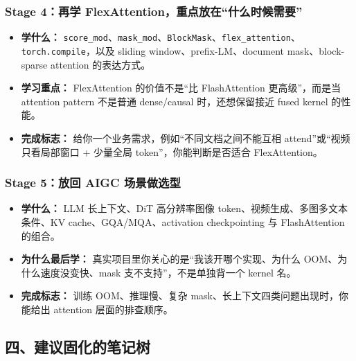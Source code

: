 \subsubsection*{Stage 4：再学 FlexAttention，重点放在“什么时候需要”}

\begin{itemize}[leftmargin=1.5em]
  \item \textbf{学什么：} \texttt{score\_mod}、\texttt{mask\_mod}、\texttt{BlockMask}、\texttt{flex\_attention}、\texttt{torch.compile}，以及 sliding window、prefix-LM、document mask、block-sparse attention 的表达方式。
  \item \textbf{学习重点：} FlexAttention 的价值不是“比 FlashAttention 更高级”，而是当 attention pattern 不是普通 dense/causal 时，还想保留接近 fused kernel 的性能。
  \item \textbf{完成标志：} 给你一个业务需求，例如“不同文档之间不能互相 attend”或“视频只看局部窗口 + 少量全局 token”，你能判断是否适合 FlexAttention。
\end{itemize}

\subsubsection*{Stage 5：放回 AIGC 场景做选型}

\begin{itemize}[leftmargin=1.5em]
  \item \textbf{学什么：} LLM 长上下文、DiT 高分辨率图像 token、视频生成、多图多文本条件、KV cache、GQA/MQA、activation checkpointing 与 FlashAttention 的组合。
  \item \textbf{为什么最后学：} 真实项目里你关心的是“我该开哪个实现、为什么 OOM、为什么速度没变快、mask 支不支持”，不是单独背一个 kernel 名。
  \item \textbf{完成标志：} 训练 OOM、推理慢、复杂 mask、长上下文四类问题出现时，你能给出 attention 层面的排查顺序。
\end{itemize}

\subsection{四、建议固化的笔记树}

